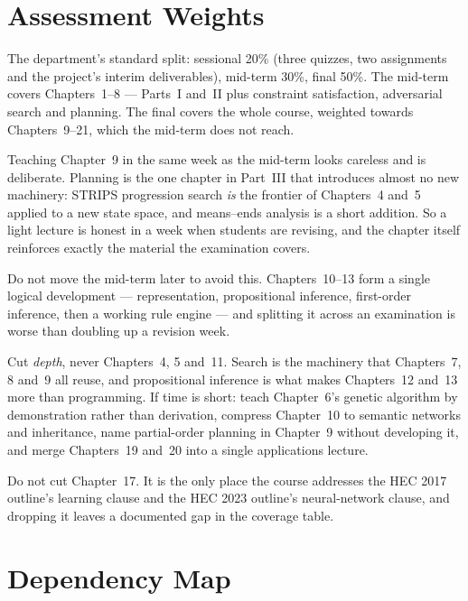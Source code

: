 \section{Assessment Weights}

The department's standard split: sessional 20\% (three quizzes, two assignments and
the project's interim deliverables), mid-term 30\%, final 50\%. The mid-term covers
Chapters~1--8 --- Parts~I and~II plus constraint satisfaction, adversarial search and
planning. The final covers the whole course, weighted towards Chapters~9--21, which
the mid-term does not reach.

\begin{alertbox}
Teaching Chapter~9 in the same week as the mid-term looks careless and is
deliberate. Planning is the one chapter in Part~III that introduces almost no new
machinery: STRIPS progression search \emph{is} the frontier of Chapters~4 and~5
applied to a new state space, and means--ends analysis is a short addition. So a
light lecture is honest in a week when students are revising, and the chapter itself
reinforces exactly the material the examination covers.

Do not move the mid-term later to avoid this. Chapters~10--13 form a single
logical development --- representation, propositional inference, first-order
inference, then a working rule engine --- and splitting it across an examination is
worse than doubling up a revision week.
\end{alertbox}

\begin{alertbox}
Cut \emph{depth}, never Chapters~4, 5 and~11. Search is the machinery that
Chapters~7, 8 and~9 all reuse, and propositional inference is what makes
Chapters~12 and~13 more than programming. If time is short: teach Chapter~6's
genetic algorithm by demonstration rather than derivation, compress Chapter~10 to
semantic networks and inheritance, name partial-order planning in Chapter~9 without
developing it, and merge Chapters~19 and~20 into a single applications lecture.

Do not cut Chapter~17. It is the only place the course addresses the HEC 2017
outline's learning clause and the HEC 2023 outline's neural-network clause, and
dropping it leaves a documented gap in the coverage table.
\end{alertbox}

\section{Dependency Map}

